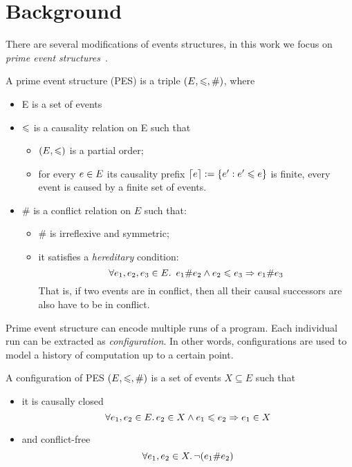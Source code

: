 \section{Background}

There are several modifications of events structures, 
in this work we focus on \emph{prime event structures}~\cite{Winskel:86}.

\begin{definition} 
\label{es_def}
A prime event structure (PES) is a triple $(E, \leqslant, \#)$, where
\begin{itemize}
  \item E is a set of events
  \item $\leqslant$ is a causality relation on E such that 
  \begin{itemize}
    \item $ (E, \leqslant) $ is a partial order;
    \item for every $e \in E$ its causality prefix ${\lceil e \rceil := \{ e' : e' \leqslant e \}}$ 
      is finite, \ie every event is caused by a finite set of events.
  \end{itemize}
  \item $\#$ is a conflict relation on $E$ such that:
  \begin{itemize}
    \item $\#$ is irreflexive and symmetric;
    \item it satisfies a \emph{hereditary} condition:
    $$ \forall e_1, e_2, e_3 \in E \ldotp \ e_1 \# e_2 \land e_2 \leqslant e_3 \Rightarrow e_1 \# e_3 $$
      That is, if two events are in conflict, then all their causal successors 
      are also have to be in conflict. 
  \end{itemize}
\end{itemize}
\end{definition}

Prime event structure can encode multiple runs of a program.
Each individual run can be extracted as \emph{configuration}. 
In other words, configurations are used to model 
a history of computation up to a certain point.

\begin{definition}
A configuration of PES $(E, \leqslant, \#)$ is a set of events $X \subseteq E$ such that
\begin{itemize}
  \item it is causally closed 
    $$ \forall e_1, e_2 \in E \ldotp e_2 \in X \land e_1 \leqslant e_2 \Rightarrow e_1 \in X $$
  \item and conflict-free 
    $$ \forall e_1, e_2 \in X \ldotp \neg (e_1 \# e_2) $$
\end{itemize}
\end{definition}

